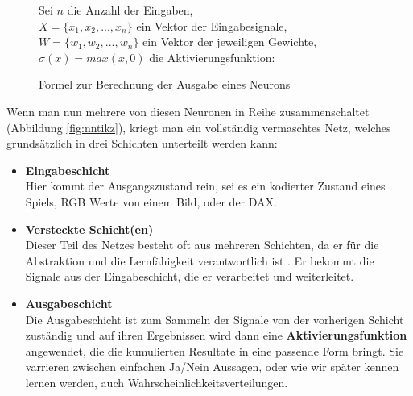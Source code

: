             \begin{figure}[H]
                \begin{mdframed}
                    \noindent
                    Sei $n$ die Anzahl der Eingaben,\\
                    \hspace*{4.5mm}    $X = \{x_1,x_2,...,x_n\}$ ein Vektor der Eingabesignale,\\
                    \hspace*{4.5mm}    $W = \{w_1,w_2,...,w_n\}$ ein Vektor der jeweiligen Gewichte, \\
                    \hspace*{4.5mm}    $\sigma(x) = max(x,0)$ die Aktivierungsfunktion:\\[4mm]
                    \hspace*{50mm} 
                \end{mdframed}
                \formforfigure
                \caption{\label{neuron-math} Formel zur Berechnung der Ausgabe eines Neurons}
            \end{figure}

            \noindent
            Wenn man nun mehrere von diesen Neuronen in Reihe zusammenschaltet (Abbildung \ref{fig:nntikz}), kriegt man ein vollständig vermaschtes Netz, welches grundsätzlich in drei Schichten unterteilt werden kann:
            \begin{itemize}
                \setlength{\itemsep}{5pt}
                \item \textbf{Eingabeschicht} \\
                    Hier kommt der Ausgangszustand rein, sei es ein kodierter Zustand eines Spiels, RGB Werte von einem Bild, oder der DAX.
                \item \textbf{Versteckte Schicht(en)} \\
                    Dieser Teil des Netzes besteht oft aus mehreren Schichten, da er für die Abstraktion und die Lernfähigkeit verantwortlich ist \cite{ANNModeling}. Er bekommt die Signale aus der Eingabeschicht, die er verarbeitet und weiterleitet.
                \item \textbf{Ausgabeschicht} \\
                    Die Ausgabeschicht ist zum Sammeln der Signale von der vorherigen Schicht zuständig und auf ihren Ergebnissen wird dann eine \textbf{Aktivierungsfunktion} angewendet, die die kumulierten Resultate in eine passende Form bringt. Sie varrieren zwischen einfachen Ja/Nein Aussagen, oder wie wir später kennen lernen werden, auch Wahrscheinlichkeitsverteilungen.

            \end{itemize}


